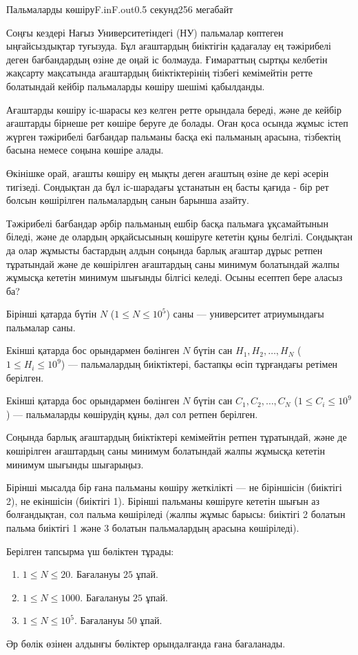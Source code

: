 \begin{problem}{Пальмаларды көшіру}{F.in}{F.out}{0.5 секунд}{256 мегабайт}

Соңғы кездері Нағыз Университетіндегі (НУ) пальмалар көптеген ыңғайсыздықтар туғызуда. Бұл ағаштардың биіктігін қадағалау ең тәжірибелі деген бағбандардың өзіне де оңай іс болмауда. Ғимараттың сыртқы келбетін жақсарту мақсатында ағаштардың биіктіктерінің тізбегі кемімейтін ретте болатындай кейбір пальмаларды көшіру шешімі қабылданды. 

Ағаштарды көшіру іс-шарасы кез келген ретте орындала береді, және де кейбір ағаштарды бірнеше рет көшіре беруге де болады. Оған қоса осында жұмыс істеп жүрген тәжірибелі бағбандар пальманы басқа екі пальманың арасына, тізбектің басына немесе соңына көшіре алады.

Өкінішке орай, ағашты көшіру ең мықты деген ағаштың өзіне де кері әсерін тигізеді. Сондықтан да бұл іс-шарадағы ұстанатын ең басты қағида - бір рет болсын көшірілген пальмалардың санын барынша азайту.

Тәжірибелі бағбандар әрбір пальманың ешбір басқа пальмаға ұқсамайтынын біледі, және де олардың әрқайсысының көшіруге кететін құны белгілі. Сондықтан да олар жұмысты бастардың алдын соңында барлық ағаштар дұрыс ретпен тұратындай және де көшірілген ағаштардың саны минимум болатындай жалпы жұмысқа кететін минимум шығынды білгісі келеді. Осыны есептеп бере аласыз ба?

\InputFile
Бірінші қатарда бүтін $N$ ($1 \le N \le 10^5$) саны --- университет атриумындағы пальмалар саны. 

Екінші қатарда бос орындармен бөлінген $N$ бүтін сан $H_1,H_2,\dots,H_N$ ($1 \le H_i \le 10^9$) --- пальмалардың биіктіктері, бастапқы өсіп тұрғандағы ретімен берілген.

Екінші қатарда бос орындармен бөлінген $N$ бүтін сан $C_1,C_2,\dots,C_N$ ($1 \le C_i \le 10^9$) --- пальмаларды көшірудің құны, дәл сол ретпен берілген.

\OutputFile
Соңында барлық ағаштардың биіктіктері кемімейтін ретпен тұратындай, және де көшірілген ағаштардың саны минимум болатындай жалпы жұмысқа кететін минимум шығынды шығарыңыз. 

\Examples

\begin{example}
%
\end{example}


Бірінші мысалда бір ғана пальманы көшіру жеткілікті --- не біріншісін (биіктігі 2), не екіншісін (биіктігі 1). Бірінші пальманы көшіруге кететін шығын аз болғандықтан, сол пальма көшіріледі (жалпы жұмыс барысы: биіктігі 2 болатын пальма биіктігі 1 және 3 болатын пальмалардың арасына көшіріледі).

\Scoring
Берілген тапсырма үш бөліктен тұрады:
\begin{enumerate}
\item $1 \le N \le 20$. Бағалануы $25$ ұпай.
\item $1 \le N \le 1000$. Бағалануы $25$ ұпай.
\item $1 \le N \le 10^5$. Бағалануы $50$ ұпай.
\end{enumerate}

Әр бөлік өзінен алдынғы бөліктер орындалғанда ғана бағаланады.

\end{problem}

